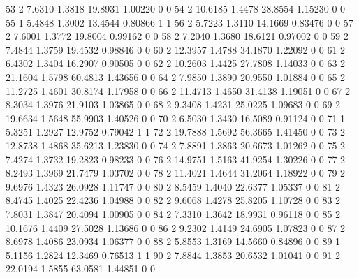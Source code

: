 \documentclass[12pt]{article}
\begin{document}
\begin{Schunk}
\begin{Soutput}
53             2  7.6310 1.3818 19.8931 1.00220         0         0
54             2 10.6185 1.4478 28.8554 1.15230         0         0
55             1  5.4848 1.3002 13.4544 0.80866         1         1
56             2  5.7223 1.3110 14.1669 0.83476         0         0
57             2  7.6001 1.3772 19.8004 0.99162         0         0
58             2  7.2040 1.3680 18.6121 0.97002         0         0
59             2  7.4844 1.3759 19.4532 0.98846         0         0
60             2 12.3957 1.4788 34.1870 1.22092         0         0
61             2  6.4302 1.3404 16.2907 0.90505         0         0
62             2 10.2603 1.4425 27.7808 1.14033         0         0
63             2 21.1604 1.5798 60.4813 1.43656         0         0
64             2  7.9850 1.3890 20.9550 1.01884         0         0
65             2 11.2725 1.4601 30.8174 1.17958         0         0
66             2 11.4713 1.4650 31.4138 1.19051         0         0
67             2  8.3034 1.3976 21.9103 1.03865         0         0
68             2  9.3408 1.4231 25.0225 1.09683         0         0
69             2 19.6634 1.5648 55.9903 1.40526         0         0
70             2  6.5030 1.3430 16.5089 0.91124         0         0
71             1  5.3251 1.2927 12.9752 0.79042         1         1
72             2 19.7888 1.5692 56.3665 1.41450         0         0
73             2 12.8738 1.4868 35.6213 1.23830         0         0
74             2  7.8891 1.3863 20.6673 1.01262         0         0
75             2  7.4274 1.3732 19.2823 0.98233         0         0
76             2 14.9751 1.5163 41.9254 1.30226         0         0
77             2  8.2493 1.3969 21.7479 1.03702         0         0
78             2 11.4021 1.4644 31.2064 1.18922         0         0
79             2  9.6976 1.4323 26.0928 1.11747         0         0
80             2  8.5459 1.4040 22.6377 1.05337         0         0
81             2  8.4745 1.4025 22.4236 1.04988         0         0
82             2  9.6068 1.4278 25.8205 1.10728         0         0
83             2  7.8031 1.3847 20.4094 1.00905         0         0
84             2  7.3310 1.3642 18.9931 0.96118         0         0
85             2 10.1676 1.4409 27.5028 1.13686         0         0
86             2  9.2302 1.4149 24.6905 1.07823         0         0
87             2  8.6978 1.4086 23.0934 1.06377         0         0
88             2  5.8553 1.3169 14.5660 0.84896         0         0
89             1  5.1156 1.2824 12.3469 0.76513         1         1
90             2  7.8844 1.3853 20.6532 1.01041         0         0
91             2 22.0194 1.5855 63.0581 1.44851         0         0

\end{Soutput}
\end{Schunk}
\end{document}
